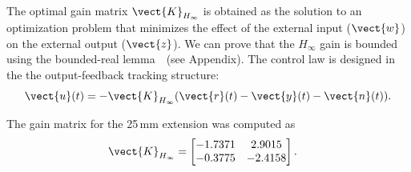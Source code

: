 The optimal gain matrix $\vect{K}_{H_{\infty}}$ is obtained as the solution to an optimization problem that minimizes the effect of the external input ($\vect{w}$) on the external output ($\vect{z}$). We can prove that the ${H_{\infty}}$ gain is bounded using the bounded-real lemma~\cite{boyd1994}~(see Appendix). The control law is designed in the the output-feedback tracking structure: \vspace{2mm}
\begin{align}
\vect{u}(t)=-\vect{K}_{H_\infty}(\vect{r}(t)-\vect{y}(t)-\vect{n}(t)). \label{eq:Hinf-ctl}
\end{align}

The gain matrix for the 25\,mm extension %
was computed as \vspace{2mm}
\begin{align*}
\vect{K}_{H_{\infty}} &=\begin{bmatrix}  
           -1.7371  &  2.9015 \\
           -0.3775  & -2.4158  
    \end{bmatrix}.
\end{align*}


